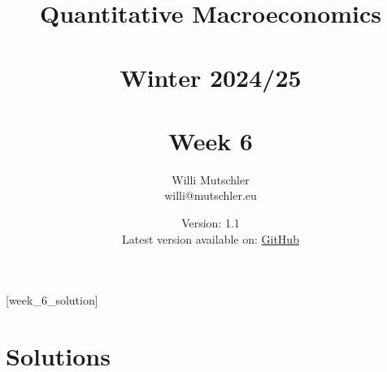 
\newif\ifDisplaySolutions\DisplaySolutionstrue%


\title{Quantitative Macroeconomics\\~\\Winter 2024/25\\~\\Week 6}
\author{Willi Mutschler\\willi@mutschler.eu}
\date{Version: 1.1\\Latest version available on: \href{https://github.com/wmutschl/Quantitative-Macroeconomics/releases/latest/download/week_6.pdf}{GitHub}}
\maketitle\thispagestyle{empty}

\newpage
{}[week_6_solution]
\tableofcontents\thispagestyle{empty}\newpage

\setcounter{page}{1}
\newpage
\newpage
\newpage
\newpage
\newpage
\printbibliography%
\newpage

\ifDisplaySolutions%
\newpage
\appendix
\section{Solutions}

\fi
